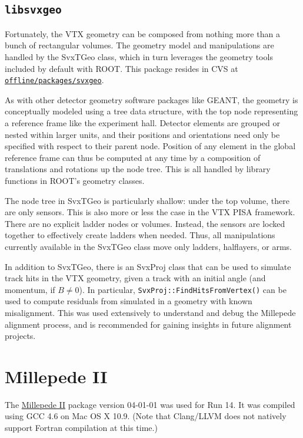 \documentclass[12pt]{article}
\begin{document}
\subsection{\texttt{libsvxgeo}} \label{sec:svxgeo}
Fortunately, the VTX geometry can be composed from nothing more than a bunch of rectangular volumes. The geometry model and manipulations are handled by the SvxTGeo class, which in turn leverages the geometry tools included by default with ROOT. This package resides in CVS at \href{https://www.phenix.bnl.gov/viewvc/viewvc.cgi/phenix/offline/packages/svxgeo}{\texttt{offline/\-packages/\-svxgeo}}.

As with other detector geometry software packages like GEANT, the geometry is conceptually modeled using a tree data structure, with the top node representing a reference frame like the experiment hall. Detector elements are grouped or nested within larger units, and their positions and orientations need only be specified with respect to their parent node. Position of any element in the global reference frame can thus be computed at any time by a composition of translations and rotations up the node tree. This is all handled by library functions in ROOT's geometry classes.

The node tree in SvxTGeo is particularly shallow: under the top volume, there are only sensors. This is also more or less the case in the VTX PISA framework.
There are no explicit ladder nodes or volumes. Instead, the sensors are locked together to effectively create ladders when needed. Thus, all manipulations currently available in the SvxTGeo class move only ladders, halflayers, or arms.

In addition to SvxTGeo, there is an SvxProj class that can be used to simulate track hits in the VTX geometry, given a track with an initial angle (and momentum, if $B \neq 0$). In particular, \texttt{SvxProj::FindHitsFromVertex()} can be used to compute residuals from simulated in a geometry with known misalignment. This was used extensively to understand and debug the Millepede alignment process, and is recommended for gaining insights in future alignment projects.

\section{Millepede II}
The \href{http://www.desy.de/~kleinwrt/MP2/doc/html/index.html}{Millepede II} package version 04-01-01 was used for Run 14. It was compiled using GCC 4.6 on Mac OS X 10.9. (Note that Clang/LLVM does not natively support Fortran compilation at this time.)
\end{document}

